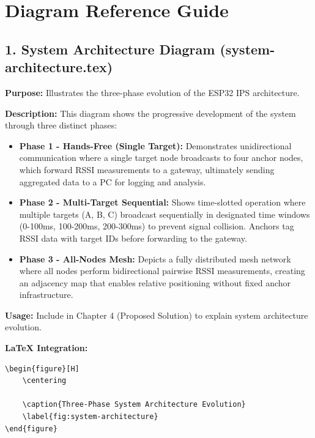 
\section*{Diagram Reference Guide}

\subsection*{1. System Architecture Diagram (system-architecture.tex)}
\textbf{Purpose:} Illustrates the three-phase evolution of the ESP32 IPS architecture.

\textbf{Description:}
This diagram shows the progressive development of the system through three distinct phases:
\begin{itemize}
    \item \textbf{Phase 1 - Hands-Free (Single Target):} Demonstrates unidirectional communication where a single target node broadcasts to four anchor nodes, which forward RSSI measurements to a gateway, ultimately sending aggregated data to a PC for logging and analysis.
    
    \item \textbf{Phase 2 - Multi-Target Sequential:} Shows time-slotted operation where multiple targets (A, B, C) broadcast sequentially in designated time windows (0-100ms, 100-200ms, 200-300ms) to prevent signal collision. Anchors tag RSSI data with target IDs before forwarding to the gateway.
    
    \item \textbf{Phase 3 - All-Nodes Mesh:} Depicts a fully distributed mesh network where all nodes perform bidirectional pairwise RSSI measurements, creating an adjacency map that enables relative positioning without fixed anchor infrastructure.
\end{itemize}

\textbf{Usage:} Include in Chapter 4 (Proposed Solution) to explain system architecture evolution.

\textbf{LaTeX Integration:}
\begin{verbatim}
\begin{figure}[H]
    \centering
    
    \caption{Three-Phase System Architecture Evolution}
    \label{fig:system-architecture}
\end{figure}
\end{verbatim}

